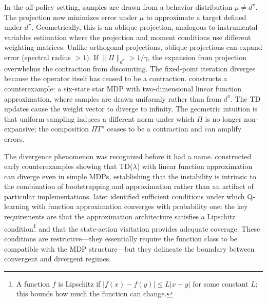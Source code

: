In the off-policy setting, samples are drawn from a behavior distribution $\mu \neq d^\pi$. The projection now minimizes error under $\mu$ to approximate a target defined under $d^\pi$. Geometrically, this is an oblique projection, analogous to instrumental variables estimation where the projection and moment conditions use different weighting matrices. Unlike orthogonal projections, oblique projections can expand error (spectral radius $> 1$). If $\|\Pi\|_{d^\pi} > 1/\gamma$, the expansion from projection overwhelms the contraction from discounting. The fixed-point iteration diverges because the operator itself has ceased to be a contraction. \citet{Baird1995} constructs a counterexample: a six-state star MDP with two-dimensional linear function approximation, where samples are drawn uniformly rather than from $d^\pi$. The TD updates cause the weight vector to diverge to infinity. The geometric intuition is that uniform sampling induces a different norm under which $\Pi$ is no longer non-expansive; the composition $\Pi T^\pi$ ceases to be a contraction and can amplify errors.

The divergence phenomenon was recognized before it had a name. \citet{Bertsekas1995_counter} constructed early counterexamples showing that TD($\lambda$) with linear function approximation can diverge even in simple MDPs, establishing that the instability is intrinsic to the combination of bootstrapping and approximation rather than an artifact of particular implementations. \citet{Melo2008} later identified sufficient conditions under which Q-learning with function approximation converges with probability one: the key requirements are that the approximation architecture satisfies a Lipschitz condition\footnote{A function $f$ is Lipschitz if $|f(x) - f(y)| \leq L|x-y|$ for some constant $L$; this bounds how much the function can change.} and that the state-action visitation provides adequate coverage. These conditions are restrictive---they essentially require the function class to be compatible with the MDP structure---but they delineate the boundary between convergent and divergent regimes.

